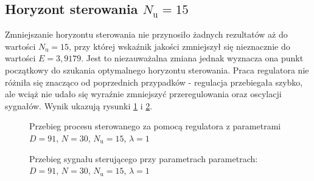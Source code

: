 \subsection{Horyzont sterowania $N_{\mathrm{u}} = 15$}
Zmniejszanie horyzontu sterowania nie przynosiło żadnych rezultatów aż do wartości $N_{\mathrm{u}} = 15$, przy której wskaźnik jakości zmniejszył się nieznacznie do wartości $E = 3,9179$. Jest to niezauważalna zmiana jednak wyznacza ona punkt początkowy do szukania optymalnego horyzontu sterowania. Praca regulatora nie różniła się znacząco od poprzednich przypadków - regulacja przebiegała szybko, ale wciąż nie udało się wyraźnie zmniejszyć przeregulowania oraz oscylacji sygnałów. Wynik ukazują rysunki \ref{dmc_Nu_15_y} i \ref{dmc_Nu_15_u}.
\\
\begin{figure}[b]
    \centering
    \caption{Przebieg procesu sterowanego za pomocą regulatora z parametrami $D = 91$, $N = 30$, $N_{\mathrm{u}} = 15$, $\lambda = 1$}
    \label{dmc_Nu_15_y}
\end{figure}

\begin{figure}[b]
    \centering
    \caption{Przebieg sygnału sterującego przy parametrach parametrach: $D = 91$, $N = 30$, $N_{\mathrm{u}} = 15$, $\lambda = 1$}
    \label{dmc_Nu_15_u}
\end{figure}


